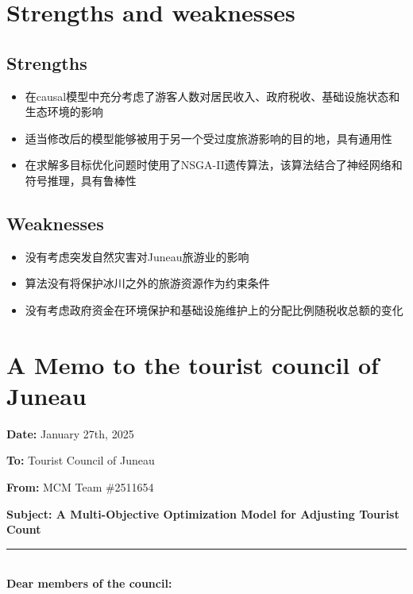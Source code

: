 \documentclass[12pt]{article}  %
\begin{document}
 \section{Strengths and weaknesses}
 
 \subsection{Strengths}
 
 \begin{itemize}
     \setlength{\parsep}{0ex} %
     \setlength{\topsep}{2ex} %
     \setlength{\itemsep}{1ex} %
     \item 在causal模型中充分考虑了游客人数对居民收入、政府税收、基础设施状态和生态环境的影响
     \item 适当修改后的模型能够被用于另一个受过度旅游影响的目的地，具有通用性
     \item 在求解多目标优化问题时使用了NSGA-II遗传算法，该算法结合了神经网络和符号推理，具有鲁棒性	
 \end{itemize}
 
 \subsection{Weaknesses}

 \begin{itemize}
    \setlength{\parsep}{0ex} %
     \setlength{\topsep}{2ex} %
     \setlength{\itemsep}{1ex} %
      \item 没有考虑突发自然灾害对Juneau旅游业的影响
      \item 算法没有将保护冰川之外的旅游资源作为约束条件
      \item 没有考虑政府资金在环境保护和基础设施维护上的分配比例随税收总额的变化
 \end{itemize}
 
 
 \clearpage
 \section{A Memo to the tourist council of Juneau}
 \noindent
 \textbf{Date:} January 27th, 2025

 \noindent
 \textbf{To:} Tourist Council of Juneau

 \noindent
 \textbf{From:} MCM Team \#2511654

 \noindent
 \textbf{Subject: A Multi-Objective Optimization Model for Adjusting Tourist Count}
 {\noindent}	 \rule[-0pt]{16.5cm}{0.15em}\\
\noindent
\textbf{Dear members of the council:}
\end{document}
